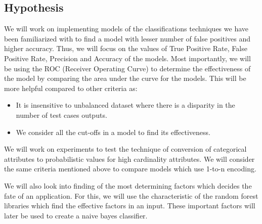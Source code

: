 \documentclass{article} %
\begin{document}
\subsection{Hypothesis}
We will work on implementing models of the classifications techniques we have been familiarized with to find a model with lesser number of false positives and higher accuracy. Thus, we will focus on the values of True Positive Rate, False Positive Rate, Precision and Accuracy of the models. Most importantly, we will be using the ROC (Receiver Operating Curve) to determine the effectiveness of the model by comparing the area under the curve for the models. This will be more helpful compared to other criteria as:
\begin{itemize}
	\item It is insensitive to unbalanced dataset where there is a disparity in the number of test cases outputs.  
	\item We consider all the cut-offs in a model to find its effectiveness.
\end{itemize}

We will work on experiments to test the technique of conversion of categorical attributes to probabilistic values for high cardinality attributes\cite{HighCard}. We will consider the same criteria mentioned above to compare models which use 1-to-n encoding. 

We will also look into finding of the most determining factors which decides the fate of an application. For this, we will use the characteristic of the random forest libraries which find the effective factors in an input. These important factors will later be used to create a naive bayes classifier.
\end{document}
